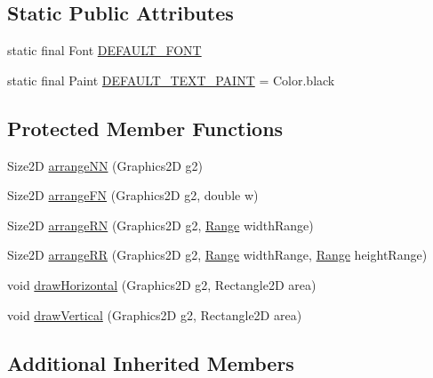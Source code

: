\subsection*{Static Public Attributes}
\begin{DoxyCompactItemize}
\item 
static final Font \mbox{\hyperlink{classorg_1_1jfree_1_1chart_1_1title_1_1_text_title_adf80811b7c40fc3d4ba0e9c0c6047944}{D\+E\+F\+A\+U\+L\+T\+\_\+\+F\+O\+NT}}
\item 
static final Paint \mbox{\hyperlink{classorg_1_1jfree_1_1chart_1_1title_1_1_text_title_a4655770eb26c1e8de8a581d95ab1f202}{D\+E\+F\+A\+U\+L\+T\+\_\+\+T\+E\+X\+T\+\_\+\+P\+A\+I\+NT}} = Color.\+black
\end{DoxyCompactItemize}
\subsection*{Protected Member Functions}
\begin{DoxyCompactItemize}
\item 
Size2D \mbox{\hyperlink{classorg_1_1jfree_1_1chart_1_1title_1_1_text_title_a7620f4432e8583f72d79851feda5c715}{arrange\+NN}} (Graphics2D g2)
\item 
Size2D \mbox{\hyperlink{classorg_1_1jfree_1_1chart_1_1title_1_1_text_title_a90b6dcb9d62b2211df78593831912eda}{arrange\+FN}} (Graphics2D g2, double w)
\item 
Size2D \mbox{\hyperlink{classorg_1_1jfree_1_1chart_1_1title_1_1_text_title_a3d2d56e3d3cbd557e9aec25f0e230a4f}{arrange\+RN}} (Graphics2D g2, \mbox{\hyperlink{classorg_1_1jfree_1_1data_1_1_range}{Range}} width\+Range)
\item 
Size2D \mbox{\hyperlink{classorg_1_1jfree_1_1chart_1_1title_1_1_text_title_a6ab494af02c8a1f60f2a7b2a4c086b88}{arrange\+RR}} (Graphics2D g2, \mbox{\hyperlink{classorg_1_1jfree_1_1data_1_1_range}{Range}} width\+Range, \mbox{\hyperlink{classorg_1_1jfree_1_1data_1_1_range}{Range}} height\+Range)
\item 
void \mbox{\hyperlink{classorg_1_1jfree_1_1chart_1_1title_1_1_text_title_a5df2253ecf06ed5b90958d1c7ac2e903}{draw\+Horizontal}} (Graphics2D g2, Rectangle2D area)
\item 
void \mbox{\hyperlink{classorg_1_1jfree_1_1chart_1_1title_1_1_text_title_a63dd967b28954cfcc5f8caf719ffc4a0}{draw\+Vertical}} (Graphics2D g2, Rectangle2D area)
\end{DoxyCompactItemize}
\subsection*{Additional Inherited Members}


